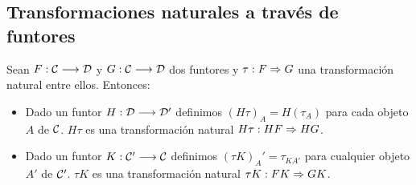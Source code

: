 \subsection{Transformaciones naturales a través de funtores}
Sean $F: \mathcal{C}\longrightarrow \mathcal{D}$ y $G: \mathcal{C}\longrightarrow \mathcal{D}$ dos funtores y
$\tau : F\Rightarrow G$ una transformación natural entre ellos.
Entonces:
\begin{itemize}
\item Dado un funtor $H: \mathcal{D}\longrightarrow \mathcal{D}'$ definimos
$(H\tau)_A = H(\tau_A)$ para cada objeto $A$ de
$\mathcal{C}$. $H\tau$ es una transformación natural
$H\tau : HF\Rightarrow HG$.
\item Dado un funtor $K: \mathcal{C}'\longrightarrow \mathcal{C}$ definimos
$(\tau K)_A' = \tau_{KA'}$ para cualquier objeto
$A'$ de $\mathcal{C}'$. $\tau K$ es una transformación natural
$\tau K : FK\Rightarrow GK$.
\end{itemize}

